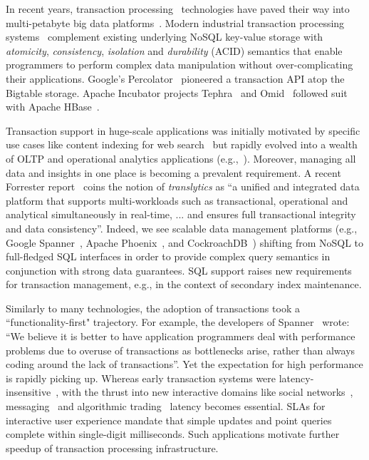 In recent years, transaction processing~\cite{Gray:1992:TPC:573304} technologies have paved their way into multi-petabyte big data 
platforms~\cite{Percolator2010,Spanner2012,Omid2017}. 
Modern industrial transaction processing systems~\cite{Percolator2010, Omid2017, tephra, cockroach} complement 
existing underlying NoSQL key-value storage with {\em atomicity}, {\em consistency}, {\em isolation\/} and {\em durability} (ACID) 
semantics that enable programmers to perform complex data manipulation without over-complicating their applications. 
Google's Percolator~\cite{Percolator2010} pioneered a transaction API atop the Bigtable storage. Apache 
Incubator projects Tephra~\cite{tephra} and Omid~\cite{Omid2017} followed suit with Apache HBase~\cite{hbase}. 

Transaction support in huge-scale applications was initially motivated by specific use cases like content indexing for web search~\cite{Percolator2010, Omid2017} but  rapidly evolved into a wealth of OLTP and operational analytics 
applications (e.g.,~\cite{Borthakur:2011, F1-2013}). Moreover, managing all data and insights in one place is becoming a prevalent requirement. A recent Forrester report~\cite{Forrester2017} coins the notion of {\em translytics}  as ``a unified and integrated data platform that supports multi-workloads such as transactional, operational and analytical simultaneously in real-time, ... and ensures full transactional integrity and data consistency''. Indeed, we see scalable data management platforms (e.g., Google Spanner~\cite{Spanner2012}, Apache Phoenix~\cite{phoenix}, and CockroachDB~\cite{cockroach}) shifting from NoSQL to full-fledged SQL interfaces in order to provide complex query semantics in conjunction with strong data guarantees. SQL support raises new requirements for transaction management, e.g., in the context of secondary index maintenance. 

Similarly to many technologies, the adoption of transactions took a  ``functionality-first" trajectory. 
For example, the developers of Spanner~\cite{Spanner2012} wrote: 
  ``We believe it
is better to have application programmers deal with performance problems due to overuse 
of transactions as bottlenecks arise, rather than always coding around the lack of transactions''. 
Yet the expectation for high performance is rapidly picking up. 
Whereas early transaction systems were  latency-insensitive~\cite{Percolator2010, Omid2017}, 
with the thrust into new interactive domains like social networks~\cite{chatter},  
messaging~\cite{Borthakur:2011} and algorithmic trading~\cite{opentsdb} latency becomes essential.  
SLAs for interactive user experience mandate that simple updates and point queries  complete within single-digit milliseconds. Such applications motivate further speedup of transaction processing infrastructure. 


